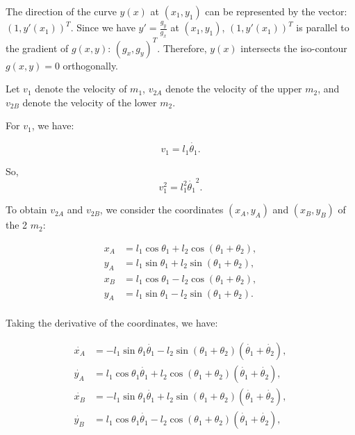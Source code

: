\documentclass[
  course = {{16-811 Math Fundamentals for Robotics}},
  quartile = {{1}},
  assignment = 5,
  name = {{Kangle Deng}},
  email = {{kangled@andrew.cmu.edu}},
  firstexercise = 1
]{aga-homework}
\begin{document}
The direction of the curve $y(x)$ at $(x_1, y_1)$ can be represented by the vector: $(1, y'(x_1))^T$. Since we have $y'= \frac{g_y}{g_x}$ at $(x_1, y_1)$, $(1, y'(x_1))^T$ is parallel to the gradient of $g(x,y)$: $(g_x, g_y)^T$. Therefore, $y(x)$ intersects the iso-contour $g(x,y)=0$ orthogonally.

\exercise
\subexercise

Let $v_1$ denote the velocity of $m_1$, $v_{2A}$ denote the velocity of the upper $m_2$, and $v_{2B}$ denote the velocity of the lower $m_2$. 

For $v_1$, we have:

\begin{equation*}
    v_1 = l_1 \Dot{\theta_1}.
\end{equation*}

So,
\begin{equation*}
    v_1^2 = l_1^2 \Dot{\theta_1}^2.
\end{equation*}

To obtain $v_{2A}$ and $v_{2B}$, we consider the coordinates $(x_A, y_A)$ and $(x_B, y_B)$ of the 2 $m_2$:

\begin{equation*}
    \begin{aligned}
     x_A & = l_1\cos\theta_1 + l_2\cos(\theta_1+\theta_2), \\
     y_A & = l_1\sin\theta_1 + l_2\sin(\theta_1+\theta_2), \\
     x_B & = l_1\cos\theta_1 - l_2\cos(\theta_1+\theta_2), \\
     y_A & = l_1\sin\theta_1 - l_2\sin(\theta_1+\theta_2). \\
    \end{aligned}
\end{equation*}

Taking the derivative of the coordinates, we have:

\begin{equation*}
    \begin{aligned}
     \Dot{x_A} & = -l_1\sin\theta_1\Dot{\theta_1} - l_2\sin(\theta_1+\theta_2)(\Dot{\theta_1}+\Dot{\theta_2}), \\
     \Dot{y_A} & = l_1\cos\theta_1\Dot{\theta_1} + l_2\cos(\theta_1+\theta_2)(\Dot{\theta_1}+\Dot{\theta_2}), \\
     \Dot{x_B} & = -l_1\sin\theta_1\Dot{\theta_1} + l_2\sin(\theta_1+\theta_2)(\Dot{\theta_1}+\Dot{\theta_2}), \\
     \Dot{y_B} & = l_1\cos\theta_1\Dot{\theta_1} - l_2\cos(\theta_1+\theta_2)(\Dot{\theta_1}+\Dot{\theta_2}), \\
    \end{aligned}
\end{equation*}
\end{document}
